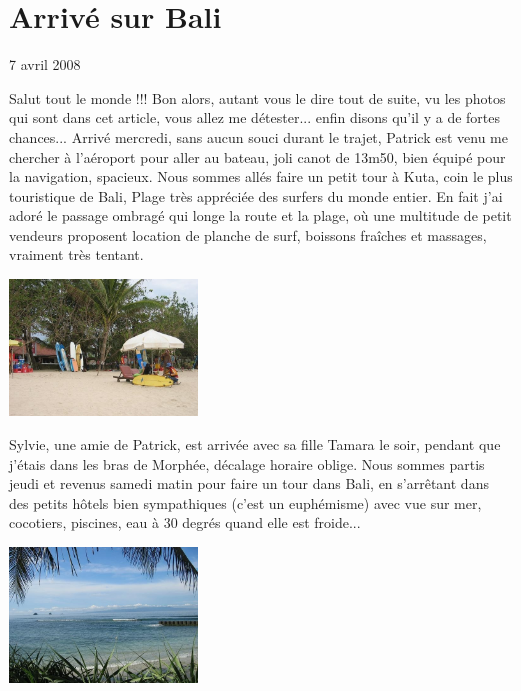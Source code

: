 \section{Arrivé sur Bali}

7 avril 2008

\begin{multicols}{2}

Salut tout le monde !!! Bon alors, autant vous le dire tout de suite, vu les photos qui sont dans cet article, vous allez me détester... enfin disons qu'il y a de fortes chances... Arrivé mercredi, sans aucun souci durant le trajet, Patrick est venu me chercher à l'aéroport pour aller au bateau, joli canot de 13m50, bien équipé pour la navigation, spacieux. Nous sommes allés faire un petit tour à Kuta, coin le plus touristique de Bali, Plage très appréciée des surfers du monde entier. En fait j'ai adoré le passage ombragé qui longe la route et la plage, où une multitude de petit vendeurs proposent location de planche de surf, boissons fraîches et massages, vraiment très tentant.

\smallbreak
\hspace*{-0.65cm}
\includegraphics[width=5cm]{articles/Arrivee-sur-bali/1207567562ikVd.jpg}
\smallbreak

Sylvie, une amie de Patrick, est arrivée avec sa fille Tamara le soir, pendant que j'étais dans les bras de Morphée, décalage horaire oblige. Nous sommes partis jeudi et revenus samedi matin pour faire un tour dans Bali, en s'arrêtant dans des petits hôtels bien sympathiques (c'est un euphémisme) avec vue sur mer, cocotiers, piscines, eau à 30 degrés quand elle est froide...

\smallbreak
\hspace*{-0.65cm}
\includegraphics[width=5cm]{articles/Arrivee-sur-bali/1207567561DqJk.jpg}
\smallbreak


\end{multicols}
